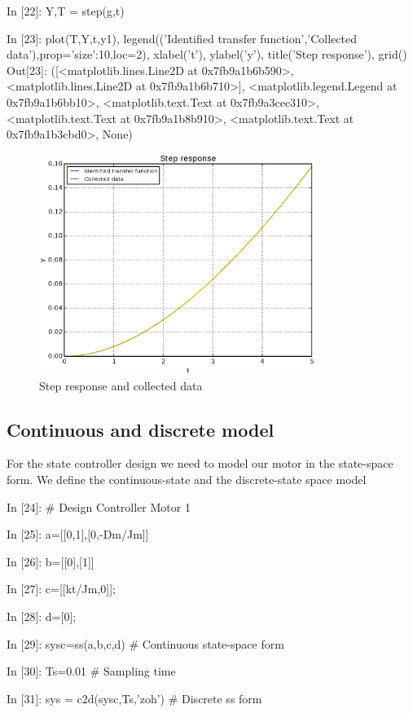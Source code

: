 \begin{code}
In [22]: Y,T = step(g,t)

In [23]: plot(T,Y,t,y1), legend(('Identified transfer function','Collected 
data'),prop={'size':10},loc=2), xlabel('t'), ylabel('y'), title('Step 
response'), grid()
Out[23]: 
([<matplotlib.lines.Line2D at 0x7fb9a1b6b590>,
  <matplotlib.lines.Line2D at 0x7fb9a1b6b710>],
 <matplotlib.legend.Legend at 0x7fb9a1b6bb10>,
 <matplotlib.text.Text at 0x7fb9a3cec310>,
 <matplotlib.text.Text at 0x7fb9a1b8b910>,
 <matplotlib.text.Text at 0x7fb9a1b3cbd0>,
 None)
\end{code}

\begin{figure}[htbp]	%
\centering
\includegraphics[width=0.8\textwidth]{eps/motid.eps}
\caption{Step response and collected data}
\label{F15}
\end{figure}

\subsection{Continuous and discrete model}
For the state controller design we need to model our motor in the state-space 
form. We define the continuous-state and the discrete-state space model

\begin{code}
In [24]: # Design Controller Motor 1

In [25]: a=[[0,1],[0,-Dm/Jm]]

In [26]: b=[[0],[1]]

In [27]: c=[[kt/Jm,0]];

In [28]: d=[0];

In [29]: sysc=ss(a,b,c,d)                # Continuous state-space form

In [30]: Ts=0.01                         # Sampling time

In [31]: sys = c2d(sysc,Ts,'zoh')        # Discrete ss form
\end{code}

